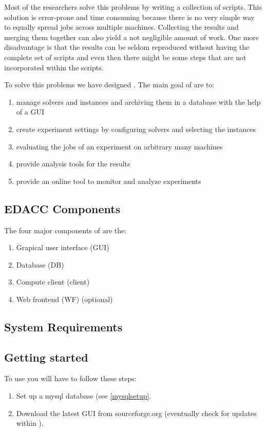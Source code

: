 Most of the researchers solve this problems by writing a collection of scripts. This solution is error-prone and time consuming because there is no very simple way to equally spread jobs across multiple machines. Collecting the results and merging them together can also yield a not negligible amount of work. 
One more disadvantage is that the results can be seldom reproduced without having the complete set of scripts and even then there might be some steps that are not incorporated within the scripts. 

To solve this problems we have designed \edacc. The main goal of \edacc are to: 
\begin{enumerate}
	\item manage solvers and instances and archiving them in a database with the help of a GUI
	\item create experiment settings by configuring solvers and selecting the instances
	\item evaluating the jobs of an experiment on arbitrary many machines
	\item provide analysis tools for the results
	\item provide an online tool to monitor and analyze experiments
\end{enumerate}

\subsection{EDACC Components}

The four major components of \edacc are the:
\begin{enumerate}
	\item Grapical user interface (GUI) 
	\item Database (DB)
	\item Compute client (client) 
	\item Web frontend (WF) (optional)
\end{enumerate}

\subsection{System Requirements}


\subsection{Getting started}
To use \edacc you will have to follow these steps: 
\begin{enumerate}
	\item Set up a mysql database (see \ref{mysqlsetup}. 
	\item Download the latest \edacc GUI from sourceforge.org (eventually check for updates within \edacc).
\end{enumerate}
	

